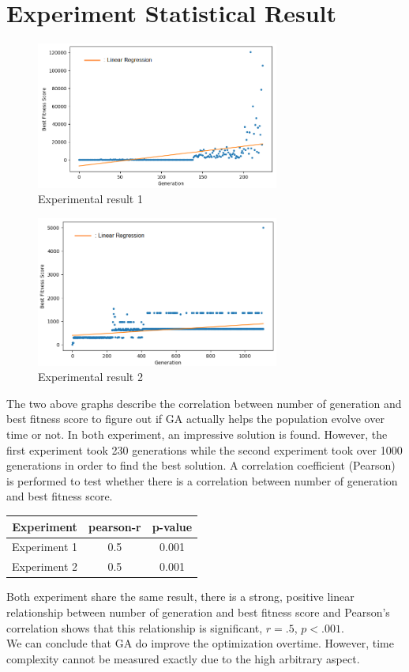 \documentclass[conference]{IEEEtran}
\begin{document}
\section{Experiment Statistical Result}
\begin{figure}[H]
    \centering
    \includegraphics[width=8cm]{plot}
    \caption{Experimental result 1}
    \label{fig:fig7}
\end{figure}
\begin{figure}[H]
    \centering
    \includegraphics[width=8cm]{plot2}
    \caption{Experimental result 2}
    \label{fig:fig8}
\end{figure}
The two above graphs describe the correlation between number of generation and best fitness score to figure out if GA actually helps the population evolve over time or not. In both experiment, an impressive solution is found. However, the first experiment took 230 generations while the second experiment took over 1000 generations in order to find the best solution. A correlation coefficient (Pearson) is performed to test whether there is a correlation between number of generation and best fitness score.
\begin{center}
 \begin{tabular}{||c c c||} 
 \hline
 Experiment & pearson-r & p-value\\ 
 \hline\hline
 Experiment 1 & 0.5 & 0.001 \\ 
 \hline \hline
 Experiment 2 & 0.5 & 0.001 \\[1ex] 
 \hline
\end{tabular}
\end{center}
Both experiment share the same result, there is a strong, positive linear relationship between number of generation and best fitness score and Pearson's correlation shows that this relationship is significant, $r=.5$, $p<.001$.\\
\indent 
We can conclude that GA do improve the optimization overtime. However, time complexity cannot be measured exactly due to the high arbitrary aspect.
\end{document}
